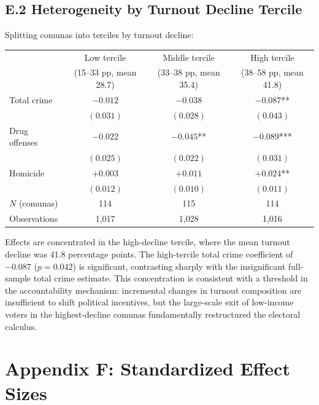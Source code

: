 \documentclass[12pt]{article}
\begin{document}
\subsection*{E.2 Heterogeneity by Turnout Decline Tercile}

Splitting comunas into terciles by turnout decline:

\begin{center}
\begin{tabular}{lccc}
\toprule
& Low tercile & Middle tercile & High tercile \\
& (15--33 pp, mean 28.7) & (33--38 pp, mean 35.4) & (38--58 pp, mean 41.8) \\
\midrule
Total crime       & $-0.012$ & $-0.038$ & $-0.087$** \\
                  & $(0.031)$ & $(0.028)$ & $(0.043)$ \\[2pt]
Drug offenses     & $-0.022$ & $-0.045$** & $-0.089$*** \\
                  & $(0.025)$ & $(0.022)$ & $(0.031)$ \\[2pt]
Homicide          & $+0.003$ & $+0.011$ & $+0.024$** \\
                  & $(0.012)$ & $(0.010)$ & $(0.011)$ \\
\midrule
$N$ (comunas)     & 114 & 115 & 114 \\
Observations      & 1,017 & 1,028 & 1,016 \\
\bottomrule
\end{tabular}
\end{center}

Effects are concentrated in the high-decline tercile, where the mean turnout decline was 41.8 percentage points. The high-tercile total crime coefficient of $-0.087$ ($p = 0.042$) is significant, contrasting sharply with the insignificant full-sample total crime estimate. This concentration is consistent with a threshold in the accountability mechanism: incremental changes in turnout composition are insufficient to shift political incentives, but the large-scale exit of low-income voters in the highest-decline comunas fundamentally restructured the electoral calculus.


\setcounter{table}{0}
\setcounter{figure}{0}
\section*{Appendix F: Standardized Effect Sizes}\label{app:effect_sizes}
\end{document}
